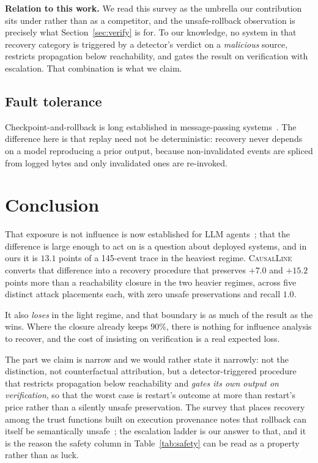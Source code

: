 \documentclass[10pt,twocolumn]{article}
\newcommand{\sys}{\textsc{CausalLine}}
\begin{document}
\textbf{Relation to this work.} We read this survey as the umbrella our
contribution sits under rather than as a competitor, and the unsafe-rollback
observation is precisely what Section~\ref{sec:verify} is for. To our
knowledge, no system in that recovery category is triggered by a detector's
verdict on a \emph{malicious} source, restricts propagation below reachability,
and gates the result on verification with escalation. That combination is what
we claim.

\subsection{Fault tolerance}

Checkpoint-and-rollback is long established in message-passing
systems~\cite{elnozahy2002}. The difference here is that replay need not be
deterministic: recovery never depends on a model reproducing a prior output,
because non-invalidated events are spliced from logged bytes and only
invalidated ones are re-invoked.

\section{Conclusion}

That exposure is not influence is now established for LLM
agents~\cite{neurotaint2026,granularity2026}; that the difference is large
enough to act on is a question about deployed systems, and in ours it is
$13.1$ points of a 145-event trace in the heaviest regime. \sys{} converts
that difference into a recovery procedure that preserves $+7.0$ and $+15.2$
points more than a reachability closure in the two heavier regimes, across
five distinct attack placements each, with zero unsafe preservations and
recall $1.0$.

It also \emph{loses} in the light regime, and that boundary is as much of the
result as the wins. Where the closure already keeps $90\%$, there is nothing
for influence analysis to recover, and the cost of insisting on verification
is a real expected loss.

The part we claim is narrow and we would rather state it narrowly: not the
distinction, not counterfactual attribution, but a detector-triggered
procedure that restricts propagation below reachability and \emph{gates its
own output on verification}, so that the worst case is restart's outcome at
more than restart's price rather than a silently unsafe preservation. The
survey that places recovery among the trust functions built on execution
provenance notes that rollback can itself be semantically
unsafe~\cite{trustsurvey2026}; the escalation ladder is our answer to that,
and it is the reason the safety column in Table~\ref{tab:safety} can be read
as a property rather than as luck.
\end{document}
